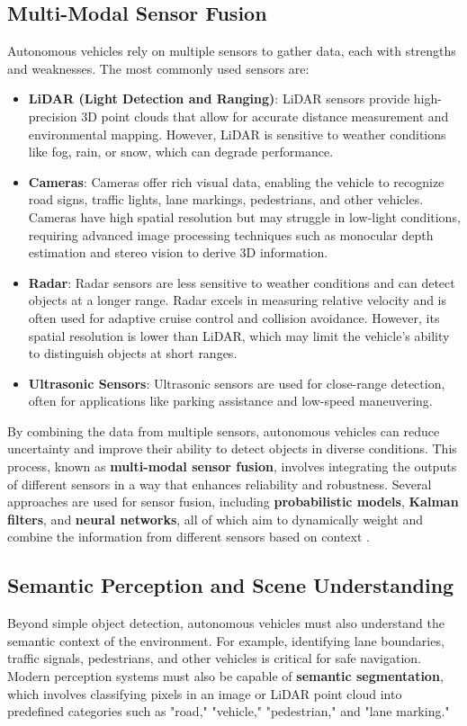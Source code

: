 \documentclass[12pt,a4paper]{article}
\begin{document}
\subsection{Multi-Modal Sensor Fusion}
Autonomous vehicles rely on multiple sensors to gather data, each with strengths and weaknesses. The most commonly used sensors are:
\begin{itemize}
    \item \textbf{LiDAR (Light Detection and Ranging)}: LiDAR sensors provide high-precision 3D point clouds that allow for accurate distance measurement and environmental mapping. However, LiDAR is sensitive to weather conditions like fog, rain, or snow, which can degrade performance.
    \item \textbf{Cameras}: Cameras offer rich visual data, enabling the vehicle to recognize road signs, traffic lights, lane markings, pedestrians, and other vehicles. Cameras have high spatial resolution but may struggle in low-light conditions, requiring advanced image processing techniques such as monocular depth estimation and stereo vision to derive 3D information.
    \item \textbf{Radar}: Radar sensors are less sensitive to weather conditions and can detect objects at a longer range. Radar excels in measuring relative velocity and is often used for adaptive cruise control and collision avoidance. However, its spatial resolution is lower than LiDAR, which may limit the vehicle’s ability to distinguish objects at short ranges.
    \item \textbf{Ultrasonic Sensors}: Ultrasonic sensors are used for close-range detection, often for applications like parking assistance and low-speed maneuvering.
\end{itemize}

By combining the data from multiple sensors, autonomous vehicles can reduce uncertainty and improve their ability to detect objects in diverse conditions. This process, known as \textbf{multi-modal sensor fusion}, involves integrating the outputs of different sensors in a way that enhances reliability and robustness. Several approaches are used for sensor fusion, including \textbf{probabilistic models}, \textbf{Kalman filters}, and \textbf{neural networks}, all of which aim to dynamically weight and combine the information from different sensors based on context \cite{huang2018apolloscape}.

\subsection{Semantic Perception and Scene Understanding}
Beyond simple object detection, autonomous vehicles must also understand the semantic context of the environment. For example, identifying lane boundaries, traffic signals, pedestrians, and other vehicles is critical for safe navigation. Modern perception systems must also be capable of \textbf{semantic segmentation}, which involves classifying pixels in an image or LiDAR point cloud into predefined categories such as "road," "vehicle," "pedestrian," and "lane marking."
\end{document}
